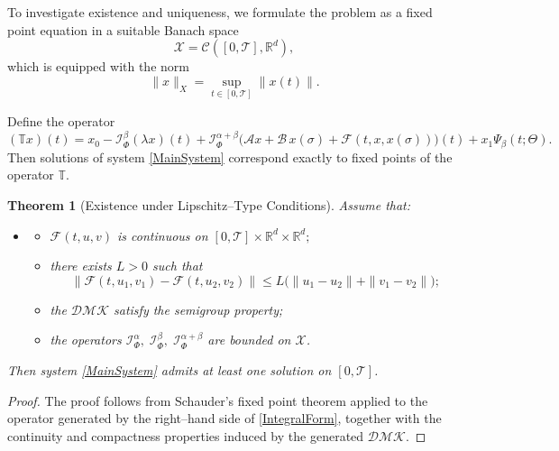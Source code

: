 \documentclass[11pt]{article}
\numberwithin{equation}{section}
\newtheorem{theorem}[definition]{Theorem}
\begin{document}
To investigate existence and uniqueness, we formulate the problem as a fixed point equation in a suitable Banach space
\[
\mathcal{X}=\mathcal{C}([0,\mathcal{T}],\mathbb R^{d}),
\]
which is equipped with the norm
\[
\|x\|_{X}
=
\sup_{t\in[0,\mathcal{T}]}
\|x(t)\|.
\]

Define the operator
\[
( \mathbb{T} x)(t)
=
x_{0}
-
\mathcal I_{\Phi}^{\beta}
(\lambda x)(t)
+
\mathcal I_{\Phi}^{\alpha+\beta}
\Big(
\mathcal{A}x
+
\mathcal{B}\,x(\sigma)
+
\mathcal{F}(t,x,x(\sigma))
\Big)(t)
+
x_{1}\Psi_{\beta}(t;\Theta).
\]
Then solutions of system \eqref{MainSystem} correspond exactly to fixed points of the operator \(\mathbb{T}\).

\begin{theorem}[Existence under Lipschitz--Type Conditions]
Assume that:
\begin{itemize}[itemsep=2pt,topsep=2pt]
\item[]
\begin{itemize}
\item[(H1)]
\(\mathcal{F}(t,u,v)\) is continuous on
\(
[0,\mathcal{T}]\times\mathbb R^{d}\times\mathbb R^{d};
\)

\item[(H2)]
there exists \(L>0\) such that
\[
\|\mathcal{F}(t,u_{1},v_{1})-\mathcal{F}(t,u_{2},v_{2})\|
\leq
L
\big(
\|u_{1}-u_{2}\|
+
\|v_{1}-v_{2}\|
\big);
\]

\item[(H3)]
the $\mathcal{DMK}$ satisfy the semigroup property;

\item[(H4)]
the operators
\(
\mathcal I_{\Phi}^{\alpha},
\;
\mathcal I_{\Phi}^{\beta},
\;
\mathcal I_{\Phi}^{\alpha+\beta}
\)
are bounded on \(\mathcal{X}\).
\end{itemize}
\end{itemize}
Then system \eqref{MainSystem} admits at least one solution on \([0,\mathcal{T}]\).
\end{theorem}

\begin{proof}
The proof follows from Schauder's fixed point theorem applied to the operator generated by the right--hand side of \eqref{IntegralForm}, together with the continuity and compactness properties induced by the generated $\mathcal{DMK}$.
\end{proof}
\end{document}
